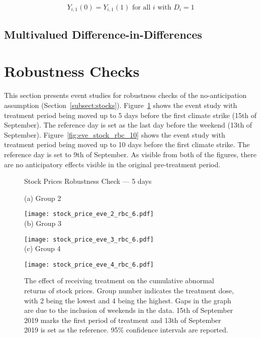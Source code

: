\documentclass[12pt]{article}
\begin{document}
\begin{equation}
    Y_{i,1}(0) = Y_{i,1}(1) \text{ for all } i \text{ with } D_i = 1
\end{equation}


\subsection{Multivalued Difference-in-Differences}


\renewcommand\thefigure{\thesection.\arabic{figure}}
\section{Robustness Checks}\label{app:robustness}
\setcounter{figure}{0} 

This section presents event studies for robustness checks of the no-anticipation assumption (Section~\ref{subsect:stocks}). Figure~\ref{fig:eve_stock_rbc_6} shows the event study with treatment period being moved up to 5 days before the first climate strike (15th of September). The reference day is set as the last day before the weekend (13th of September). Figure~\ref{fig:eve_stock_rbc_10} shows the event study with treatment period being moved up to 10 days before the first climate strike. The reference day is set to 9th of September. As visible from both of the figures, there are no anticipatory effects visible in the original pre-treatment period.

\begin{figure}
    \caption{Stock Prices Robustness Check --- 5 days}\label{fig:eve_stock_rbc_6}
    \centering
    
    (a) Group 2
    
    \texttt{[image: stock\_price\_eve\_2\_rbc\_6.pdf]} \\
    
    (b) Group 3
    
    \texttt{[image: stock\_price\_eve\_3\_rbc\_6.pdf]} \\
    
    (c) Group 4
    
    \texttt{[image: stock\_price\_eve\_4\_rbc\_6.pdf]}
    
    \captionsetup{font=footnotesize}
    \caption*{The effect of receiving treatment on the cumulative abnormal returns of stock prices. Group number indicates the treatment dose, with 2 being the lowest and 4 being the highest. Gaps in the graph are due to the inclusion of weekends in the data. 15th of September 2019 marks the first period of treatment and 13th of September 2019 is set as the reference. 95\% confidence intervals are reported.}
\end{figure}
\end{document}
